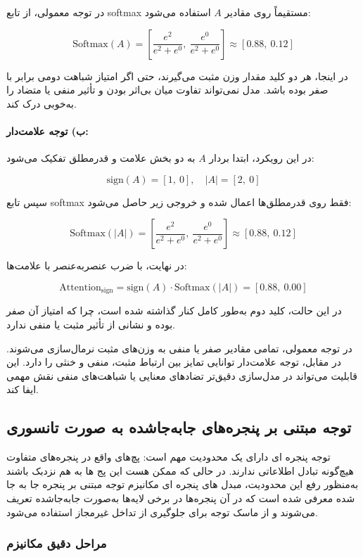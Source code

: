 در توجه معمولی، از تابع softmax مستقیماً روی مقادیر $A$ استفاده می‌شود:

\[
\text{Softmax}(A) =
\left[
\frac{e^2}{e^2 + e^0},\ 
\frac{e^0}{e^2 + e^0}
\right]
\approx [0.88,\ 0.12]
\]

در اینجا، هر دو کلید مقدار وزن مثبت می‌گیرند، حتی اگر امتیاز شباهت دومی برابر با صفر بوده باشد. مدل نمی‌تواند تفاوت میان بی‌اثر بودن و تأثیر منفی یا متضاد را به‌خوبی درک کند.

\paragraph{ب) توجه علامت‌دار:}

در این رویکرد، ابتدا بردار $A$ به دو بخش علامت و قدرمطلق تفکیک می‌شود:

\[
\text{sign}(A) = [1,\ 0], \quad
|A| = [2,\ 0]
\]

سپس تابع softmax فقط روی قدرمطلق‌ها اعمال شده و خروجی زیر حاصل می‌شود:

\[
\text{Softmax}(|A|) = 
\left[
\frac{e^2}{e^2 + e^0},\ 
\frac{e^0}{e^2 + e^0}
\right]
\approx [0.88,\ 0.12]
\]

در نهایت، با ضرب عنصر‌به‌عنصر با علامت‌ها:

\[
\text{Attention}_{\text{sign}} = 
\text{sign}(A) \cdot \text{Softmax}(|A|) = [0.88,\ 0.00]
\]

در این حالت، کلید دوم به‌طور کامل کنار گذاشته شده است، چرا که امتیاز آن صفر بوده و نشانی از تأثیر مثبت یا منفی ندارد.


در توجه معمولی، تمامی مقادیر صفر یا منفی به وزن‌های مثبت نرمال‌سازی می‌شوند. در مقابل، توجه علامت‌دار توانایی تمایز بین ارتباط مثبت، منفی و خنثی را دارد. این قابلیت می‌تواند در مدل‌سازی دقیق‌تر تضادهای معنایی یا شباهت‌های منفی نقش مهمی ایفا کند.


\subsection{توجه مبتنی بر پنجره‌های جابه‌جا‌شده به صورت تانسوری}



توجه پنجره ای دارای یک محدودیت مهم است: پچ‌های واقع در پنجره‌های متفاوت هیچ‌گونه تبادل اطلاعاتی ندارند.
در حالی که ممکن هست این پج ها به هم نزدبک باشند به‌منظور رفع این محدودیت، مبدل های پنجره ای مکانیزم توجه مبتنی بر پنجره جا به جا شده معرفی شده است که در آن پنجره‌ها در برخی لایه‌ها به‌صورت جابه‌جا‌شده تعریف می‌شوند و از ماسک توجه برای جلوگیری از تداخل غیرمجاز استفاده می‌شود.

\subsubsection*{مراحل دقیق مکانیزم }

